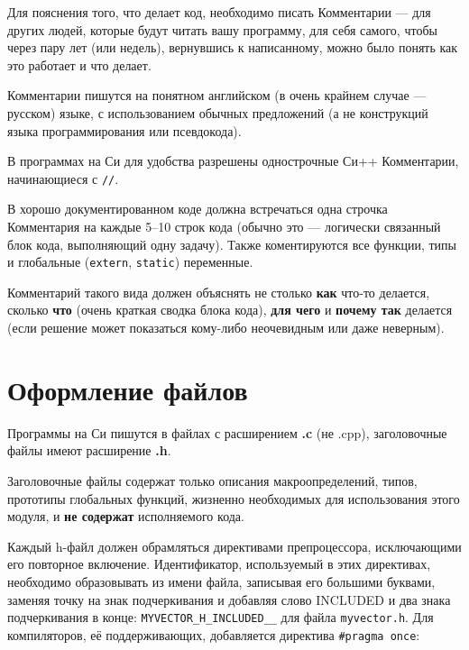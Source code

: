 \zzstyleitem

Для пояснения того, что делает код, необходимо писать Комментарии ---
для других людей, которые будут читать вашу программу, для себя самого,
чтобы через пару лет (или недель), вернувшись к написанному, можно было
понять как это работает и что делает.

\zzstyleitem

Комментарии пишутся на понятном английском (в очень крайнем случае ---
русском) языке, с использованием обычных предложений (а не конструкций
языка программирования или псевдокода).

\zzstyleitem

В программах на Си для удобства разрешены однострочные Си++ Комментарии,
начинающиеся с \texttt{//}.

\zzstyleitem

В хорошо документированном коде должна встречаться одна строчка
Комментария на каждые 5--10 строк кода (обычно это --- логически
связанный блок кода, выполняющий одну задачу). Также коментируются все
функции, типы и глобальные (\texttt{extern}, \texttt{static})
переменные.

\zzstyleitem

Комментарий такого вида должен объяснять не столько \textbf{как} что-то
делается, сколько \textbf{что} (очень краткая сводка блока кода),
\textbf{для чего} и \textbf{почему так} делается (если решение может
показаться кому-либо неочевидным или даже неверным).


\section{Оформление файлов}


\zzstyleitem

Программы на Си пишутся в файлах с расширением \textbf{.c} (не .cpp),
заголовочные файлы имеют расширение \textbf{.h}.

\zzstyleitem

Заголовочные файлы содержат только описания макроопределений, типов,
прототипы глобальных функций, жизненно необходимых для использования
этого модуля, и \textbf{не содержат} исполняемого кода.

\zzstyleitem

Каждый h-файл должен обрамляться директивами препроцессора, исключающими
его повторное включение. Идентификатор, используемый в этих директивах,
необходимо образовывать из имени файла, записывая его большими буквами,
заменяя точку на знак подчеркивания и добавляя слово INCLUDED и два
знака подчеркивания в конце: \texttt{MYVECTOR\_H\_INCLUDED\_\_} для
файла \texttt{myvector.h}. Для компиляторов, её поддерживающих,
добавляется директива \texttt{\#pragma\ once}:

